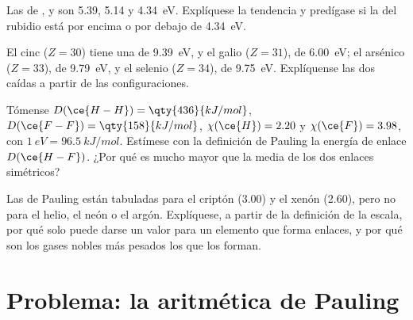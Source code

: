 \begin{exercise}[$\star\star$]\label{exo:b1:periodicity:9}
Las  de ,  y  son
5.39, 5.14 y \qty{4.34}{eV}. Explíquese la tendencia y predígase si la
del rubidio está por encima o por debajo de \qty{4.34}{eV}.
\end{exercise}

\begin{exercise}[$\star\star\star$]\label{exo:b1:periodicity:10}
El cinc ($Z = 30$) tiene una  de
\qty{9.39}{eV}, y el galio ($Z = 31$), de \qty{6.00}{eV}; el arsénico
($Z = 33$), de \qty{9.79}{eV}, y el selenio ($Z = 34$), de
\qty{9.75}{eV}. Explíquense las dos caídas a partir de las
configuraciones.
\end{exercise}

\begin{exercise}[$\star\star\star$]\label{exo:b1:periodicity:11}
Tómense $D(\ce{H-H}) = \qty{436}{kJ/mol}$, $D(\ce{F-F}) =
\qty{158}{kJ/mol}$, $\chi(\ce{H}) = 2.20$ y $\chi(\ce{F}) = 3.98$, con
$\qty{1}{eV} = \qty{96.5}{kJ/mol}$. Estímese con la definición de Pauling
la energía de enlace $D(\ce{H-F})$. ¿Por qué es mucho mayor que la media
de los dos enlaces simétricos?
\end{exercise}

\begin{exercise}[$\star\star\star$]\label{exo:b1:periodicity:12}
Las  de Pauling están tabuladas para el criptón
(3.00) y el xenón (2.60), pero no para el helio, el neón o el argón.
Explíquese, a partir de la definición de la escala, por qué solo puede
darse un valor para un elemento que forma enlaces, y por qué son los
gases nobles más pesados los que los forman.
\end{exercise}

\section{Problema: la aritmética de Pauling}


